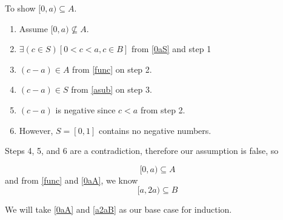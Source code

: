 \documentclass[12pt]{article}
\begin{document}
\begin{framed}
    To show $[0, a) \subseteq A$.
    \begin{enumerate}
        \item Assume $[0, a) \not \subseteq A$.
        \item $\exists (c \in S)[0 < c < a, c \in B]$ from \eqref{0aS} and step 1
        \item $(c-a) \in A$ from \eqref{func} on step 2.
        \item $(c-a) \in S$ from \eqref{asub} on step 3.
        \item $(c-a)$ is negative since $c < a$ from step 2.
        \item However, $S = [0,1]$ contains no negative numbers.
    \end{enumerate}
    Steps 4, 5, and 6 are a contradiction, therefore our assumption is false, so 
\end{framed}
\begin{equation} \label{0aA}
    [0, a) \subseteq A
\end{equation}
and from \eqref{func} and \eqref{0aA}, we know
\begin{equation} \label{a2aB}
    [a, 2a) \subseteq B
\end{equation}

We will take \eqref{0aA} and \eqref{a2aB} as our base case for induction. 
\end{document}
